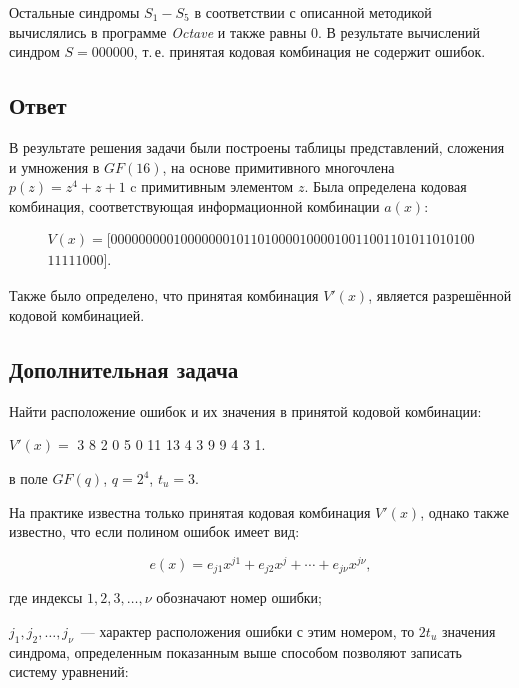 Остальные синдромы $S_1 - S_5$ в соответствии с описанной методикой
вычислялись в программе \textit{Octave} и также равны 0. В результате
вычислений синдром $S = 000000$, т.\,е. принятая кодовая комбинация не
содержит ошибок.

\subsection{Ответ}

В результате решения задачи были построены таблицы представлений,
сложения и умножения в $GF(16)$, на основе примитивного многочлена
$p(z)=z^4+z+1$ c примитивным элементом $z$. Была определена кодовая
комбинация, соответствующая информационной комбинации $a(x)$:

\begin{gather*}
  V(x) = [0000000001000000010110100001000010011001101011010100\\
  11111000].
\end{gather*}


Также было определено, что принятая комбинация $V'(x)$, является
разрешённой кодовой комбинацией.

\subsection{Дополнительная задача}

Найти расположение ошибок и их значения в принятой кодовой комбинации:

\begin{center}
  $V'(x) = $ 3 8 2 0 5 0 11 13 4 3 9 9 4 3 1.
\end{center}

в поле $GF(q)$, $q = 2^4$, $t_u = 3$.

На практике известна только принятая кодовая комбинация $V'(x)$,
однако также известно, что если полином ошибок имеет вид:

\begin{equation}
  \label{eq:errors_poly}
  e(x) = e_{j1}x^{j1} + e_{j2}x^{j} + \cdots + e_{j\nu}x^{j\nu},
\end{equation}

\begin{ESKDexplanation}
\item[где ] индексы $1, 2, 3, \ldots , \nu$ обозначают номер ошибки;
\item $j_1, j_2, \ldots , j_{\nu}$~--- характер расположения ошибки с
  этим номером, то $2t_u$ значения синдрома, определенным показанным
  выше способом позволяют записать систему уравнений:
\end{ESKDexplanation}

